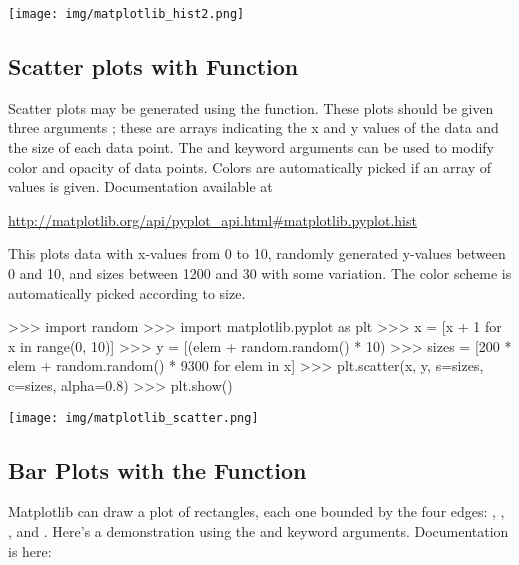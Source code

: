 \documentclass[11pt]{cselabheader}
\begin{document}
\begin{center}
\texttt{[image: img/matplotlib\_hist2.png]}
\end{center}

\subsection{Scatter plots with  Function}

Scatter plots may be generated using the 
function.  These plots should be given three arguments
; these are arrays indicating the x and y values
of the data and the size of each data point.  The  and
 keyword arguments can be used to modify color and
opacity of data points. Colors are automatically picked if an array of
values is given. Documentation available at

\begin{center}
\url{http://matplotlib.org/api/pyplot_api.html#matplotlib.pyplot.hist}
\end{center}

This plots data with x-values from 0 to 10, randomly generated
y-values between 0 and 10, and sizes between 1200 and 30 with some variation.
The color scheme is automatically picked according to size.

\begin{pyconcode}
>>> import random
>>> import matplotlib.pyplot as plt
>>> x = [x + 1 for x in range(0, 10)]
>>> y = [(elem + random.random() * 10) %
>>> sizes = [200 * elem + random.random() * 9300 for elem in x]
>>> plt.scatter(x, y, s=sizes, c=sizes, alpha=0.8)
>>> plt.show()
\end{pyconcode}

\begin{center}
\texttt{[image: img/matplotlib\_scatter.png]}
\end{center}

\subsection{Bar Plots with the  Function}

Matplotlib can draw a plot of rectangles, each one bounded by the four edges:
, , , and
. Here's a demonstration using the
 and  keyword arguments.
Documentation is here:
\end{document}
